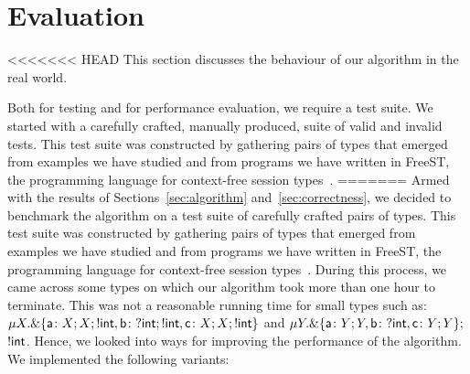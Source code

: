 \section{Evaluation}
\label{sec:evaluation}

<<<<<<< HEAD
This section discusses the behaviour of our algorithm in the real
world.

Both for testing and for performance evaluation, we require a test
suite. We started with a carefully crafted, manually produced, suite
of valid and invalid tests. This test suite was constructed by
gathering pairs of types that emerged from examples we have studied
and from programs we have written in FreeST, the programming language
for context-free session
types~\cite{almeida.etal_freest-functional-language}.
=======
Armed with the results of Sections~\ref{sec:algorithm}
and~\ref{sec:correctness}, we decided to benchmark the algorithm on a
test suite of carefully crafted pairs of types. This test suite was constructed by
gathering pairs of types that emerged from examples we have studied
and from programs we have written in FreeST, the programming language
for context-free session
types~\cite{almeida.etal_freest-functional-language}. 
During this process, we came across 
some types
%
%
on which our algorithm took more than one hour
to terminate. This was not a reasonable running time for small 
types such as: 
$\mu X . \&\{ \mathsf{a}\colon X;X; !\mathsf{int},
    \mathsf{b}\colon ?\mathsf{int};!\mathsf{int},
    \mathsf{c}\colon X;X;!\mathsf{int} \}$
and 
$\mu Y . \&\{ \mathsf{a}\colon Y;Y,
    \mathsf{b}\colon ?\mathsf{int},
    \mathsf{c}\colon Y;Y \};$ $ !\mathsf{int}$.
Hence, we
looked into ways for improving the performance of the algorithm. 
We implemented the
following variants: 
